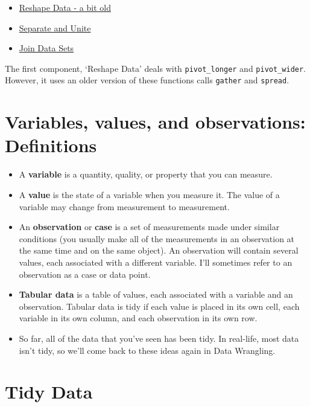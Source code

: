 \documentclass[
  xelatex, ja=standard]{bxjsbook}
\providecommand{\tightlist}{%
  \setlength{\itemsep}{0pt}\setlength{\parskip}{0pt}}
\theoremstyle{definition}
\theoremstyle{definition}
\theoremstyle{definition}
\theoremstyle{definition}
\theoremstyle{remark}
\begin{document}
\begin{itemize}
\tightlist
\item
  \href{https://rstudio.cloud/learn/primers/4.1}{Reshape Data - a bit old}
\item
  \href{https://rstudio.cloud/learn/primers/4.2}{Separate and Unite}
\item
  \href{https://rstudio.cloud/learn/primers/4.3}{Join Data Sets}
\end{itemize}

The first component, `Reshape Data' deals with \texttt{pivot\_longer} and \texttt{pivot\_wider}. However, it uses an older version of these functions calls \texttt{gather} and \texttt{spread}.

\hypertarget{variables-values-and-observations-definitions}{%
\section{Variables, values, and observations: Definitions}\label{variables-values-and-observations-definitions}}

\begin{itemize}
\tightlist
\item
  A \textbf{variable} is a quantity, quality, or property that you can measure.
\item
  A \textbf{value} is the state of a variable when you measure it. The value of a variable may change from measurement to measurement.
\item
  An \textbf{observation} or \textbf{case} is a set of measurements made under similar conditions (you usually make all of the measurements in an observation at the same time and on the same object). An observation will contain several values, each associated with a different variable. I'll sometimes refer to an observation as a case or data point.
\item
  \textbf{Tabular data} is a table of values, each associated with a variable and an observation. Tabular data is tidy if each value is placed in its own cell, each variable in its own column, and each observation in its own row.
\item
  So far, all of the data that you've seen has been tidy. In real-life, most data isn't tidy, so we'll come back to these ideas again in Data Wrangling.
\end{itemize}

\hypertarget{tidy-data}{%
\section{Tidy Data}\label{tidy-data}}
\end{document}

